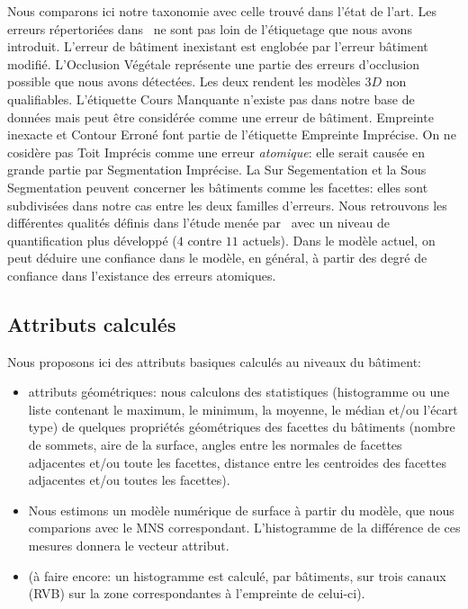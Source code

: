 \documentclass[a4paper,french]{article}
\begin{document}
    Nous comparons ici notre taxonomie avec celle trouvé dans l'état de l'art. Les erreurs répertoriées dans~\cite{Michelin2013} ne sont pas loin de l'étiquetage que nous avons introduit. L'erreur de bâtiment inexistant est englobée par l'erreur bâtiment modifié. L'Occlusion Végétale représente une partie des erreurs d'occlusion possible que nous avons détectées. Les deux rendent les modèles $3D$ non qualifiables. L'étiquette Cours Manquante n'existe pas dans notre base de données mais peut être considérée comme une erreur de bâtiment. Empreinte inexacte et Contour Erroné font partie de l'étiquette Empreinte Imprécise. On ne cosidère pas Toit Imprécis comme une erreur \emph{atomique}: elle serait causée en grande partie par Segmentation Imprécise. La Sur Segementation et la Sous Segmentation peuvent concerner les bâtiments comme les facettes: elles sont subdivisées dans notre cas entre les deux familles d'erreurs. Nous retrouvons les différentes qualités définis dans l'étude menée par~\cite{Boudet2006} avec un niveau de quantification plus développé ($4$ contre $11$ actuels). Dans le modèle actuel, on peut déduire une confiance dans le modèle, en général, à partir des degré de confiance dans l'existance des erreurs atomiques.

    \subsection{Attributs calculés}

    Nous proposons ici des attributs basiques calculés au niveaux du bâtiment:
    \begin{itemize}[itemsep=0pt]
        \item attributs géométriques: nous calculons des statistiques (histogramme ou une liste contenant le maximum, le minimum, la moyenne, le médian et/ou l'écart type) de quelques propriétés géométriques des facettes du bâtiments (nombre de sommets, aire de la surface, angles entre les normales de facettes adjacentes et/ou toute les facettes, distance entre les centroides des facettes adjacentes et/ou toutes les facettes).
        \item Nous estimons un modèle numérique de surface à partir du modèle, que nous comparions avec le MNS correspondant. L'histogramme de la différence de ces mesures donnera le vecteur attribut.
        \item (à faire encore: un histogramme est calculé, par bâtiments, sur trois canaux (RVB) sur la zone correspondantes à l'empreinte de celui-ci).
    \end{itemize}
\end{document}
